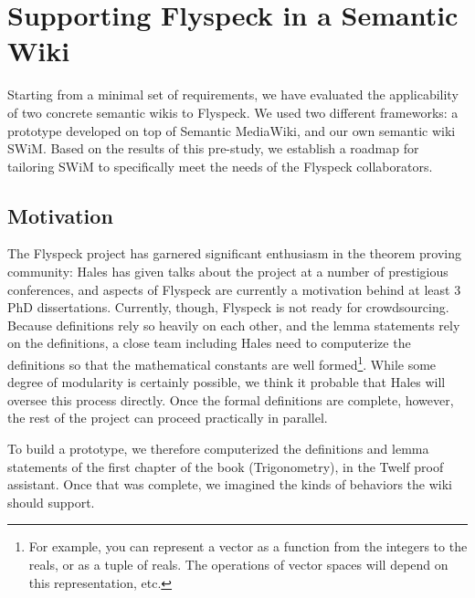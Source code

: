 
\section{Supporting Flyspeck in a Semantic Wiki}

Starting from a minimal set of requirements, we have evaluated the
applicability of two concrete semantic wikis to Flyspeck.  We used two
different frameworks: a prototype developed on top of Semantic
MediaWiki, and our own semantic wiki SWiM.  Based on the results of
this pre-study, we establish a roadmap for tailoring SWiM to
specifically meet the needs of the Flyspeck collaborators.

\subsection{Motivation}
\label{sec:req}

The Flyspeck project has garnered significant enthusiasm in the
theorem proving community: Hales has given talks about the project at
a number of prestigious conferences, and aspects of Flyspeck are
currently a motivation behind at least 3 PhD dissertations.  
Currently, though, Flyspeck is not ready for crowdsourcing.  Because
definitions rely so heavily on each other, and the lemma statements
rely on the definitions, a close team including Hales need to 
computerize the definitions so that the mathematical constants
are well formed\footnote{For example, you can represent a vector as
a function from the integers to the reals, or as a tuple of reals.
The operations of vector spaces will depend on this representation, etc.}.
While some degree of modularity is certainly possible, we think
it probable that Hales will oversee this process directly.
Once the formal definitions are complete, however, the rest
of the project can proceed practically in parallel.  

To build a prototype, we therefore computerized the definitions and
lemma statements of the first chapter of
the book (Trigonometry), in the Twelf\cite{Schurmann:1999:Twelf} 
proof assistant.  Once that was complete, we imagined the
kinds of behaviors the wiki should support.


